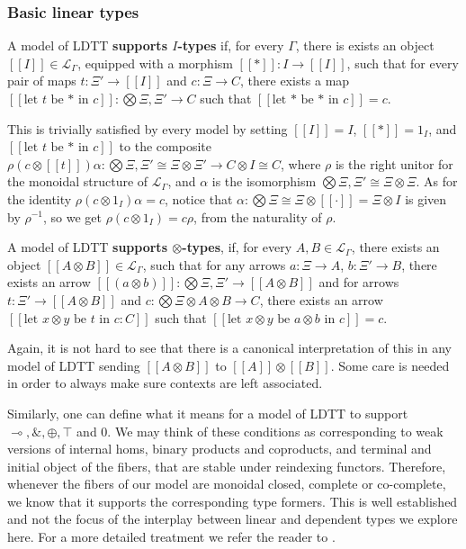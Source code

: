   \subsubsection{Basic linear types}
  \begin{defn}
  A model of LDTT \textbf{supports $I$-types} if, for every $\Gamma$, there is exists an object $[[I]] \in \mathcal{L}_{\Gamma}$, equipped with a morphism $[[*]] : I \to [[I]]$, such that for every pair of maps $t : \Xi' \to [[I]]$ and $c : \Xi \to C$, there exists a map $[[\text{let $t$ be * in $c$}]] : \bigotimes \Xi, \Xi' \to C$ such that $[[\text{let * be * in $c$}]] = c$.
\end{defn}
This is trivially satisfied by every model by setting $[[I]] = I$, $[[*]] = 1_{I}$, and $[[\text{let $t$ be * in $c$}]]$ to the composite $\rho (c \otimes [[t]]) \alpha  : \bigotimes \Xi, \Xi' \cong \Xi \otimes \Xi' \to C \otimes I \cong C$, where $\rho$ is the right unitor for the monoidal structure of $\mathcal{L}_{\Gamma}$, and $\alpha$ is the isomorphism $\bigotimes \Xi, \Xi' \cong \Xi \otimes \Xi$. As for the identity $\rho(c \otimes 1_{I}) \alpha = c$, notice that $\alpha : \bigotimes \Xi \cong \Xi \otimes [[\cdot]] = \Xi \otimes I$ is given by $\rho^{-1}$, so we get $\rho (c \otimes 1_I) = c \rho$, from the naturality of $\rho$.

\begin{defn}
  A model of LDTT \textbf{supports $\otimes$-types}, if, for every $A, B \in \mathcal{L}_{\Gamma}$, there exists an object $[[A \otimes B]] \in \mathcal{L}_{\Gamma}$, such that for any arrows $a : \Xi \to A$, $b : \Xi' \to B$, there exists an arrow $[[(a \otimes b)]] : \bigotimes \Xi, \Xi' \to [[A \otimes B]]$ and for arrows $t : \Xi' \to [[A \otimes B]]$ and $c : \bigotimes \Xi \otimes A \otimes B \to C$, there exists an arrow $[[\text{let $x \otimes y$ be $t$ in $c : C$}]]$ such that $[[\text{let $x \otimes y$ be $a \otimes b$ in $c$}]] = c$.
\end{defn}
Again, it is not hard to see that there is a canonical interpretation of this in any model of LDTT sending $[[A \otimes B]]$ to $[[A]] \otimes [[B]]$. Some care is needed in order to always make sure contexts are left associated.


Similarly, one can define what it means for a model of LDTT to support $\multimap, \&, \oplus, \top$ and $0$. We may think of these conditions as corresponding to weak versions of internal homs, binary products and coproducts, and terminal and initial object of the fibers, that are stable under reindexing functors. Therefore, whenever the fibers of our model are monoidal closed, complete or co-complete, we know that it supports the corresponding type formers. This is well established and not the focus of the interplay between linear and dependent types we explore here. For a more detailed treatment we refer the reader to \cite{mellies}.
